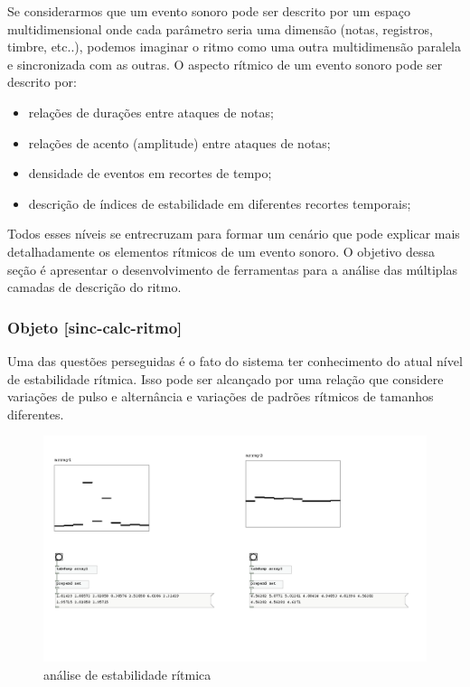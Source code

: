 \documentclass{ppgmus}
\begin{document}
Se considerarmos que um evento sonoro pode ser descrito por um espaço multidimensional
onde cada parâmetro seria uma dimensão (notas, registros, timbre, etc..), podemos
imaginar o ritmo como uma outra multidimensão paralela e sincronizada com as outras.
O aspecto rítmico de um evento sonoro pode ser descrito por:
\begin{itemize}
 \item relações de durações entre ataques de notas;
\item relações de acento (amplitude) entre ataques de notas;
\item densidade de eventos em recortes de tempo;
\item descrição de índices de estabilidade em diferentes recortes temporais;
\end{itemize}

Todos esses níveis se entrecruzam para formar um cenário que pode explicar mais detalhadamente
os elementos rítmicos de um evento sonoro. O objetivo dessa seção é apresentar o desenvolvimento de
ferramentas para a análise das múltiplas camadas de descrição do ritmo.


% 



\subsubsection{Objeto [sinc-calc-ritmo]}

Uma das questões perseguidas é o fato do sistema ter conhecimento do atual nível de 
estabilidade rítmica. Isso pode ser alcançado por uma relação que considere variações
de pulso e alternância e variações de padrões rítmicos de tamanhos diferentes.

\begin{figure}[!htt]
\includegraphics[scale=.6]{prot5a}
\caption{análise de estabilidade rítmica}
\label{prot5a}
\end{figure} 
\end{document}
